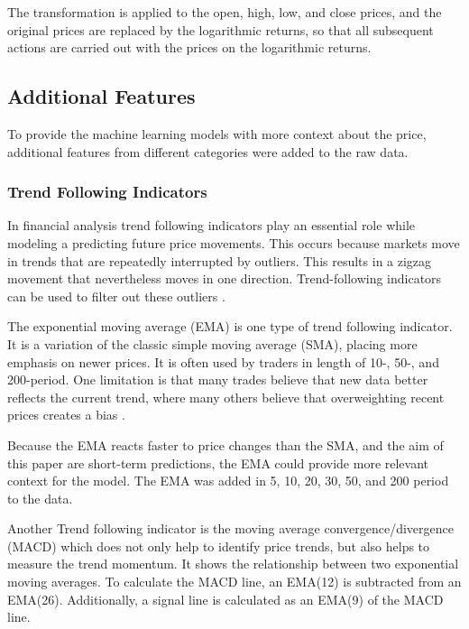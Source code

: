 The transformation is applied to the open, high, low, and close prices, and the original prices are replaced by the logarithmic returns, so that all subsequent actions are carried out with the prices on the logarithmic returns.

\subsection{Additional Features}
\label{chap:additional-features}

To provide the machine learning models with more context about the price, additional features from different categories were added to the raw data.

\subsubsection{Trend Following Indicators}

In financial analysis trend following indicators play an essential role while modeling a predicting future price movements.
This occurs because markets move in trends that are repeatedly interrupted by outliers.
This results in a zigzag movement that nevertheless moves in one direction.
Trend-following indicators can be used to filter out these outliers \cite{investopia-trend-indicators}.

The exponential moving average (EMA) is one type of trend following indicator.
It is a variation of the classic simple moving average (SMA), placing more emphasis on newer prices.
It is often used by traders in length of 10-, 50-, and 200-period.
One limitation is that many trades believe that new data better reflects the current trend, where many others believe that overweighting recent prices creates a bias \cite{investopia-ema}.


Because the EMA reacts faster to price changes than the SMA, and the aim of this paper are short-term predictions, the EMA could provide more relevant context for the model.
The EMA was added in 5, 10, 20, 30, 50, and 200 period to the data.

Another Trend following indicator is the moving average convergence/divergence (MACD) which does not only help to identify price trends, but also helps to measure the trend momentum.
It shows the relationship between two exponential moving averages.
To calculate the MACD line, an EMA(12) is subtracted from an EMA(26).
Additionally, a signal line is calculated as an EMA(9) of the MACD line.

